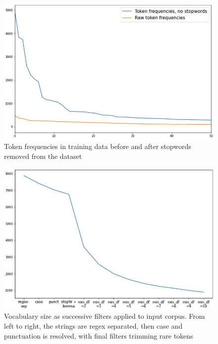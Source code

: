 \documentclass[11pt,a4paper]{article}
\begin{document}
\begin{figure}[htpb]
  \centering
  \includegraphics[width=1\linewidth]{imgs/stopwords.png}
  \caption{Token frequencies in training data before and after 
  stopwords removed from the dataset}%
  \label{fig:stopwords}
\end{figure}

\begin{figure}[htpb]
  \centering
  \includegraphics[width=1\linewidth]{imgs/token_filter.png}
  \caption{Vocabulary size as successive filters applied to input corpus. 
    From left to right, the strings are regex separated, then case and
  punctuation is resolved, with final filters trimming rare tokens}
  \label{fig:imgs/token_filter}
\end{figure}
\end{document}
